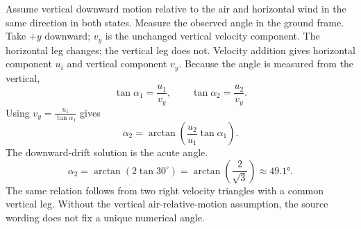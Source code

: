 \quizpairbreak
\begin{problem}[25 pts]
\end{problem}
\begin{solution}
Assume vertical downward motion relative to the air and horizontal wind
in the same direction in both states. Measure the observed angle in the
ground frame. Take $+y$ downward; $v_y$ is the unchanged vertical velocity component.
The horizontal leg changes; the vertical leg does not.
Velocity addition gives horizontal component $u_i$ and vertical component $v_y$.
Because the angle is measured from the vertical,
\[
\tan\alpha_1=\frac{u_1}{v_y},\qquad
\tan\alpha_2=\frac{u_2}{v_y}.
\]
Using $v_y=\frac{u_1}{\tan\alpha_1}$ gives
\[
\alpha_2=\arctan\!\left(\frac{u_2}{u_1}\tan\alpha_1\right).
\]
The downward-drift solution is the acute angle.
\[
\alpha_2=\arctan\!\left(2\tan30^\circ\right)
=\arctan\!\left(\frac{2}{\sqrt3}\right)\approx\ang{49.1}.
\]
The same relation follows from two right velocity triangles with a
common vertical leg. Without the vertical air-relative-motion assumption,
the source wording does not fix a unique numerical angle.
\end{solution}

